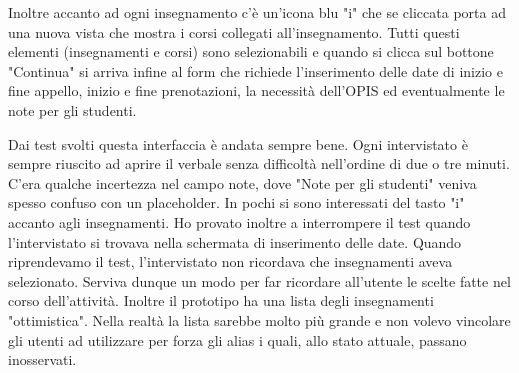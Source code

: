 \documentclass[Lau, oneside, noexaminfo]{sapthesis}%
\begin{document}
Inoltre accanto ad ogni insegnamento c'è un'icona blu "i" che se cliccata porta ad una nuova vista che mostra i corsi collegati all'insegnamento. Tutti questi elementi (insegnamenti e corsi) sono selezionabili e quando si clicca sul bottone "Continua" si arriva infine al form che richiede l'inserimento delle date di inizio e fine appello, inizio e fine prenotazioni, la necessità dell'OPIS ed eventualmente le note per gli studenti.

Dai test svolti questa interfaccia è andata sempre bene. Ogni intervistato è sempre riuscito ad aprire il verbale senza difficoltà nell'ordine di due o tre minuti. C'era qualche incertezza nel campo note, dove "Note per gli studenti" veniva spesso confuso con un placeholder. In pochi si sono interessati del tasto "i" accanto agli insegnamenti. Ho provato inoltre a interrompere il test quando l'intervistato si trovava nella schermata di inserimento delle date. Quando riprendevamo il test, l'intervistato non ricordava che insegnamenti aveva selezionato. Serviva dunque un modo per far ricordare all'utente le scelte fatte nel corso dell'attività. Inoltre il prototipo ha una lista degli insegnamenti "ottimistica". Nella realtà la lista sarebbe molto più grande e non volevo vincolare gli utenti ad utilizzare per forza gli alias i quali, allo stato attuale, passano inosservati.
\end{document}
